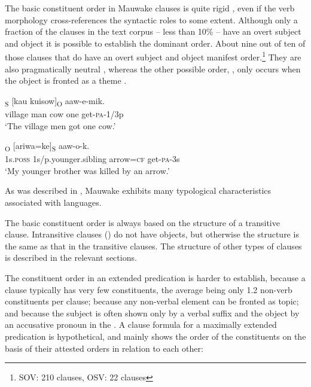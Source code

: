 The basic constituent order in Mauwake clauses is quite rigid , even if the verb morphology cross-references the syntactic roles to some extent. Although only a fraction of the clauses in the text corpus -- less than 10\% -- have an overt subject and object  it is possible to establish the dominant order. About nine out of ten of those clauses that do have an overt subject and object  manifest  order.\footnote{SOV: 210 clauses, OSV: 22 clauses} They are also pragmatically neutral , whereas the other possible order, , only occurs when the object is fronted as a theme . 

\ea%
\label{ex:5:x896}
\textsubscript{S}  [kau  kuisow]\textsubscript{O}  aaw-e-mik. \\
     village  man  cow  one  get-\textsc{pa}-1/3p \\
\glt `The village men got one cow.'
\z
 

\ea%
\label{ex:5:x897}
\textsubscript{O}  [ariwa=ke]\textsubscript{S}  aaw-o-k. \\
      1s.\textsc{poss}  1s/p.younger.sibling  arrow=\textsc{cf}  get-\textsc{pa}-3s \\
\glt `My younger brother was killed by an arrow.'
\z

As was described in , Mauwake exhibits many typological characteristics associated with  languages.

The basic constituent order is always based on the structure of a transitive clause. Intransitive clauses () do not have objects, but otherwise the structure is the same as that in the transitive clauses. The structure of other types of clauses is described in the relevant sections.

The constituent order in an extended predication is harder to establish, because a clause typically has very few constituents, the average being only 1.2 non-verb constituents per clause; because any non-verbal element can be fronted as topic; and because the subject is often shown only by a verbal suffix and the object by an accusative pronoun in the . A clause formula for a maximally extended predication is hypothetical, and mainly shows the order of the constituents on the basis of their attested orders in relation to each other: 

